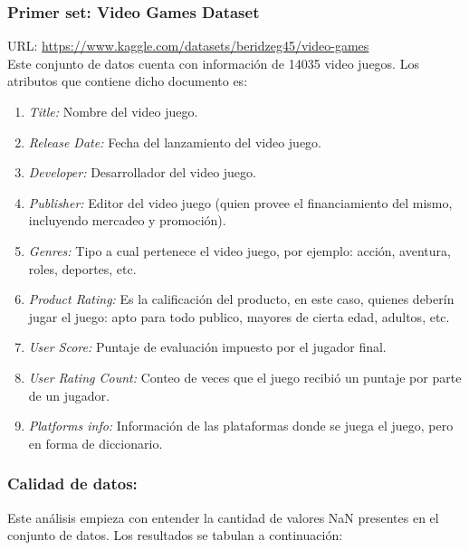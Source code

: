\documentclass[a4paper]{article}
\begin{document}
\subsubsection{Primer set: Video Games Dataset}
URL: \url{https://www.kaggle.com/datasets/beridzeg45/video-games}\\
    Este conjunto de datos cuenta con información de 14035 video juegos. Los atributos que contiene dicho documento es:
    \begin{enumerate}
        \item \textit{Title:} Nombre del video juego.
        \item \textit{Release Date:} Fecha del lanzamiento del video juego.
        \item \textit{Developer:} Desarrollador del video juego.
        \item \textit{Publisher:} Editor del video juego (quien provee el financiamiento del mismo, incluyendo mercadeo y promoción).
        \item \textit{Genres:} Tipo a cual pertenece el video juego, por ejemplo: acción, aventura, roles, deportes, etc.
        \item \textit{Product Rating:} Es la calificación del producto, en este caso, quienes deber\'{i}n jugar el juego: apto para todo publico, mayores de cierta edad, adultos, etc.
        \item \textit{User Score:} Puntaje de evaluación impuesto por el jugador final.
        \item \textit{User Rating Count:} Conteo de veces que el juego recibió un puntaje por parte de un jugador.
        \item \textit{Platforms info:} Información de las plataformas donde se juega el juego, pero en forma de diccionario.
    \end{enumerate}\newpage

\subsubsection{Calidad de datos:}
Este análisis empieza con entender la cantidad de valores NaN presentes en el conjunto de datos. Los resultados se tabulan a continuación:
    
\end{document}
